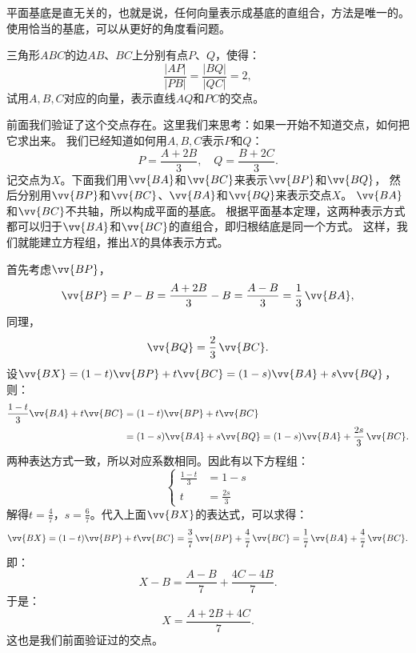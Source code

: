 \documentclass[12pt,UTF8,fontset=none]{ctexbook}
\begin{document}
平面基底是直无关的，也就是说，任何向量表示成基底的直组合，方法是唯一的。
使用恰当的基底，可以从更好的角度看问题。

\begin{et}\label{et:0-0-20}
    三角形$ABC$的边$AB$、$BC$上分别有点$P$、$Q$，使得：
    $$ \frac{|AP|}{|PB|} = \frac{|BQ|}{|QC|} = 2,$$
    试用$A,B,C$对应的向量，表示直线$AQ$和$PC$的交点。
\end{et}
\begin{so}
    前面我们验证了这个交点存在。这里我们来思考：如果一开始不知道交点，如何把它求出来。
    我们已经知道如何用$A,B,C$表示$P$和$Q$：
    $$ P = \frac{A + 2B}{3}, \quad Q = \frac{B + 2C}{3}. $$
    记交点为$X$。下面我们用$\vv{BA}$和$\vv{BC}$来表示$\vv{BP}$和$\vv{BQ}$，
    然后分别用$\vv{BP}$和$\vv{BC}$、$\vv{BA}$和$\vv{BQ}$来表示交点$X$。
    $\vv{BA}$和$\vv{BC}$不共轴，所以构成平面的基底。
    根据平面基本定理，这两种表示方式都可以归于$\vv{BA}$和$\vv{BC}$的直组合，即归根结底是同一个方式。
    这样，我们就能建立方程组，推出$X$的具体表示方式。

    首先考虑$\vv{BP}$，
    $$\vv{BP} = P - B = \frac{A + 2B}{3} - B = \frac{A - B}{3} = \frac13 \, \vv{BA},$$
    同理，
    $$\vv{BQ} = \frac23 \, \vv{BC}.$$
    设$\vv{BX} = (1 - t)\vv{BP} + t\vv{BC} = (1 - s)\vv{BA} + s\vv{BQ}$，则：
    \begin{align*}
        \frac{1 - t}{3}\vv{BA} + t\vv{BC} &= (1 - t)\vv{BP} + t\vv{BC}  \\
        &= (1 - s)\vv{BA} + s\vv{BQ} = (1 - s)\vv{BA} + \frac{2s}{3}\,\vv{BC}.  
    \end{align*}
    两种表达方式一致，所以对应系数相同。因此有以下方程组：
    $$
    \left\{
    \begin{array}{ll}
        \frac{1 - t}{3} &= 1 - s \\
        t &= \frac{2s}{3}
    \end{array}
    \right.
    $$
    解得$t = \frac{4}{7}$，$s = \frac{6}{7}$。代入上面$\vv{BX}$的表达式，可以求得：
    $$\vv{BX} = (1 - t)\vv{BP} + t\vv{BC} = \frac{3}{7} \, \vv{BP} + \frac{4}{7} \, \vv{BC} = \frac17 \, \vv{BA} + \frac{4}{7} \, \vv{BC}. $$
    即：
    $$ X - B = \frac{A - B}{7} + \frac{4C - 4B}{7}.$$
    于是：
    $$ X = \frac{A + 2B + 4C}{7}.$$
    这也是我们前面验证过的交点。    
\end{so}
\end{document}
